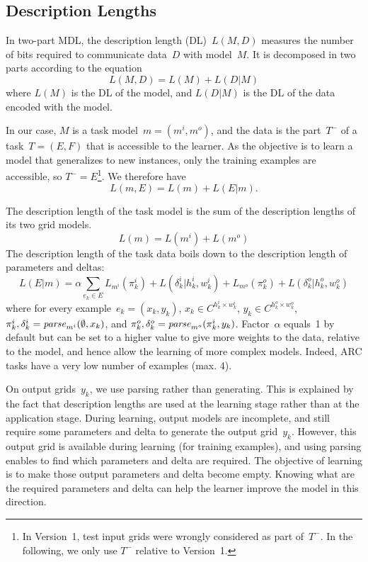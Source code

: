 \documentclass[a4paper]{llncs}
\begin{document}
\subsection{Description Lengths}
\label{dl}

In two-part MDL, the description length (DL)~$L(M,D)$ measures the number
of bits required to communicate data~$D$ with model~$M$. It is
decomposed in two parts according to the equation
\[ L(M,D) = L(M) + L(D|M) \] where $L(M)$ is the DL of the model, and
$L(D|M)$ is the DL of the data encoded with the model.

In our case, $M$ is a task model~$m = (m^i,m^o)$, and the data is the
part~$T^-$ of a task~$T = (E,F)$ that is accessible to the learner.
As the objective is to learn a model that generalizes to new
instances, only the training examples are accessible, so
$T^- = E$\footnote{In Version~1, test input grids were wrongly
  considered as part of~$T^-$. In the following, we only use $T^-$
  relative to Version~1.}.
We therefore have
\[ L(m,E) = L(m) + L(E|m). \]

The description length of the task model is the sum of the description
lengths of its two grid models.
\[ L(m) = L(m^i) + L(m^o) \] 
%
The description length of the task data boils down to the description
length of parameters and deltas:
\[
L(E|m) = \alpha \sum_{e_k \in E} L_{m^i}(\pi^i_k) + L(\delta^i_k|h^i_k,w^i_k) + L_{m^o}(\pi^o_k) + L(\delta^o_k|h^o_k,w^o_k)
\]
%
where for every example~$e_k = (x_k,y_k)$,
$x_k \in C^{h^i_k \times w^i_k}$, $y_k \in C^{h^o_k \times w^o_k}$,
$\pi^i_k, \delta^i_k = {\it parse}_{m^i}(\emptyset,x_k)$, and
$\pi^o_k, \delta^o_k = {\it parse}_{m^o}(\pi^i_k,y_k)$.
%
Factor~$\alpha$ equals~1 by default but can be set to a higher value
to give more weights to the data, relative to the model, and hence
allow the learning of more complex models. Indeed, ARC tasks have a
very low number of examples (max. 4).

On output grids~$y_k$, we use parsing rather than generating. This is
explained by the fact that description lengths are used at the
learning stage rather than at the application stage. During learning,
output models are incomplete, and still require some parameters and
delta to generate the output grid~$y_k$. However, this output grid is
available during learning (for training examples), and using parsing
enables to find which parameters and delta are required. The objective
of learning is to make those output parameters and delta become
empty. Knowing what are the required parameters and delta can help the
learner improve the model in this direction.
\end{document}
